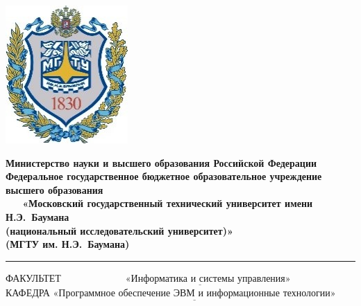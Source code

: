 \thispagestyle{empty}
\begin{titlepage}

\noindent \begin{minipage}{0.15\textwidth}
	\includegraphics[width=\linewidth]{img/b_logo}
	\end{minipage}
	\noindent\begin{minipage}{0.9\textwidth}\centering
		\textbf{Министерство науки и высшего образования Российской Федерации}\\
		\textbf{Федеральное государственное бюджетное образовательное учреждение высшего образования}\\
		\textbf{~~~«Московский государственный технический университет имени Н.Э.~Баумана}\\
		\textbf{(национальный исследовательский университет)»}\\
		\textbf{(МГТУ им. Н.Э.~Баумана)}
	\end{minipage}
	
	\noindent\rule{18cm}{3pt}
	\newline\newline
	\noindent ФАКУЛЬТЕТ $\underline{\text{~~~~~~~~~~~~~~~~~~~«Информатика и системы управления»~~~~~~~~~~~~~~}}$ \newline\newline
	\noindent КАФЕДРА $\underline{\text{«Программное обеспечение ЭВМ и информационные технологии»}}$\newline\newline\newline\newline\newline
	

\end{titlepage}
